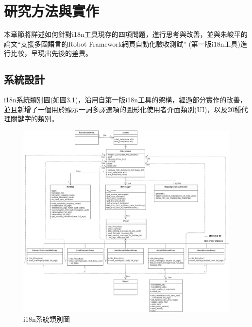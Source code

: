 \chapter{研究方法與實作}
本章節將詳述如何針對i18n工具現存的四項問題，進行思考與改善，並與朱峻平的論文“支援多國語言的Robot Framework網頁自動化驗收測試” (第一版i18n工具)進行比較，呈現出先後的差異。

\section{系統設計}
i18n系統類別圖(如圖3.1)，沿用自第一版i18n工具的架構，經過部分實作的改善，並且新增了一個用於顯示一詞多譯選項的圖形化使用者介面類別(UI)，以及20種代理關鍵字的類別。 

\begin{figure}[H]
\flushleft
\includegraphics[width= 180mm]{../UML/i18n class diagram-i18n class diagram.png}
\caption{i18n系統類別圖}
\end{figure}

\hspace*{\fill} \\
\\ \hspace*{\fill} \\
\\ \hspace*{\fill} \\
\\ \hspace*{\fill} \\
\\ \hspace*{\fill} \\


